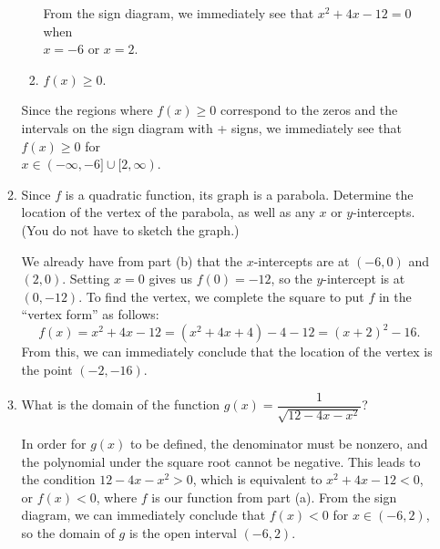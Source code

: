 \documentclass[12pt]{article}
\newcommand{\points}[1]{\marginpar{\hspace{24pt}[#1]}}
\begin{document}
\begin{enumerate}
\begin{enumerate}
\begin{enumerate}
\bigskip

From the sign diagram, we immediately see that $x^2+4x-12=0$ when\\ $x=-6$ or $x=2$.


\bigskip

 \item $f(x)\geq 0$. \points{1}
\end{enumerate}


\bigskip

Since the regions where $f(x)\geq 0$ correspond to the zeros and the intervals on the sign diagram with + signs, we immediately see that $f(x)\geq 0$ for\\ $x\in (-\infty, -6]\cup [2,\infty)$.

\bigskip


\item Since $f$ is a quadratic function, its graph is a parabola. Determine the location of the vertex of the parabola, as well as any $x$ or $y$-intercepts. (You do not have to sketch the graph.) \points{3}
\bigskip

We already have from part (b) that the $x$-intercepts are at $(-6,0)$ and $(2,0)$. Setting $x=0$ gives us $f(0)=-12$, so the $y$-intercept is at $(0,-12)$. To find the vertex, we complete the square to put $f$ in the ``vertex form'' as follows:
\[
 f(x) = x^2+4x-12 = (x^2+4x+4)-4-12 = (x+2)^2-16.
\]
From this, we can immediately conclude that the location of the vertex is the point $(-2,-16)$.

\bigskip


\item What is the domain of the function $g(x) = \dfrac{1}{\sqrt{12-4x-x^2}}$? \points{1}


\bigskip

In order for $g(x)$ to be defined, the denominator must be nonzero, and the polynomial under the square root cannot be negative. This leads to the condition $12-4x-x^2>0$, which is equivalent to $x^2+4x-12<0$, or $f(x)<0$, where $f$ is our function from part (a). From the sign diagram, we can immediately conclude that $f(x)<0$ for $x\in (-6,2)$, so the domain of $g$ is the open interval $(-6,2)$.


\end{enumerate}


\end{enumerate}
\end{document}
